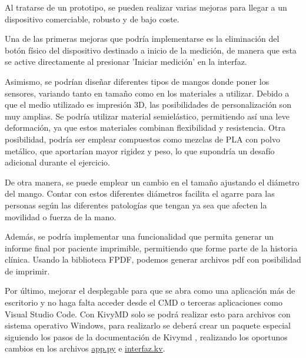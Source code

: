 Al tratarse de un prototipo, se pueden realizar varias mejoras para llegar a un dispositivo comerciable, robusto y de bajo coste.

Una de las primeras mejoras que podría implementarse es la eliminación del botón físico del dispositivo destinado a inicio de la medición, de manera que esta se active directamente al presionar 'Iniciar medición' en la interfaz. 

Asimismo, se podrían diseñar diferentes tipos de mangos donde poner los sensores, variando tanto en tamaño como en los materiales a utilizar. Debido a que el medio utilizado es impresión 3D, las posibilidades de personalización son muy amplias. Se podría utilizar material semielástico, permitiendo así una leve deformación, ya que estos materiales combinan flexibilidad y resistencia. Otra posibilidad, podría ser emplear compuestos como mezclas de PLA con polvo metálico, que aportarían mayor rigidez y peso, lo que supondría un desafío adicional durante el ejercicio.

De otra manera, se puede emplear un cambio en el tamaño ajustando el diámetro del mango. Contar con estos diferentes diámetros facilita el agarre para las personas según las diferentes patologías que tengan ya sea que afecten la movilidad o fuerza de la mano.

Además, se podría implementar una funcionalidad que permita generar un informe final por paciente imprimible, permitiendo que forme parte de la historia clínica. Usando la biblioteca FPDF, podemos generar archivos pdf con posibilidad de imprimir.

Por último, mejorar el desplegable para que se abra como una aplicación más de escritorio y no haga falta acceder desde el CMD o terceras aplicaciones como Visual Studio Code.
Con KivyMD solo se podrá realizar esto para archivos con sistema operativo Windows, para realizarlo se deberá crear un paquete especial siguiendo los pasos de la documentación de Kivymd \cite{kivymdapp}, realizando los oportunos cambios en los archivos \href{https://github.com/cva1003/TFG/blob/main/Aplicaci%C3%B3nEscritorio/app.py}{app.py} e \href{https://github.com/cva1003/TFG/blob/main/Aplicaci%C3%B3nEscritorio/interfaz.kv}{interfaz.kv}.